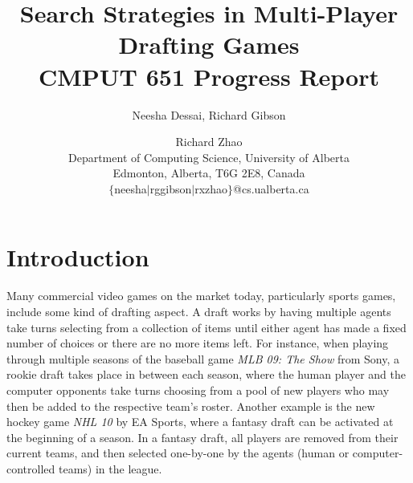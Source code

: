 \documentclass[letterpaper]{article}
\title{Search Strategies in Multi-Player Drafting Games  \\ \small \vspace{0.1cm} CMPUT 651 Progress Report}
\author{Neesha Dessai, Richard Gibson \and Richard Zhao \\
Department of Computing Science, University of Alberta \\
Edmonton, Alberta, T6G 2E8, Canada \\
$\{$neesha$\mid$rggibson$\mid$rxzhao$\}$@cs.ualberta.ca}
\numberwithin{equation}{section}
\numberwithin{theorem}{section}
\numberwithin{lemma}{section}
\numberwithin{df}{section}
\begin{document}
\maketitle


\section{Introduction}


Many commercial video games on the market today, particularly sports games, include some kind of drafting aspect.  A draft works by having multiple agents take turns selecting from a collection of items until either agent has made a fixed number of choices or there are no more items left.  For instance, when playing through multiple seasons of the baseball game \textit{MLB 09: The Show} from Sony, a rookie draft takes place in between each season, where the human player and the computer opponents take turns choosing from a pool of new players who may then be added to the respective team's roster.  Another example is the new hockey game \textit{NHL 10} by EA Sports, where a fantasy draft can be activated at the beginning of a season.  In a fantasy draft, all players are removed from their current teams, and then selected one-by-one by the agents (human or computer-controlled teams) in the league.  


\end{document}
